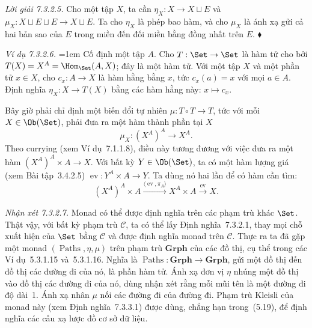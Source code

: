 \noindent\textit{Lời giải 7.3.2.5.}\keepwithnext
Cho một tập $X$, ta cần $\eta_X:X\to X\sqcup E$ và $\mu_X:X\sqcup E\sqcup E\to X\sqcup E$. Ta cho $\eta_X$ là phép bao hàm, và cho $\mu_X$ là ánh xạ gửi cả hai bản sao của $E$ trong miền đến đối miền bằng đồng nhất trên $E$.
\hfill$\blacklozenge$

\noindent\textit{Ví dụ 7.3.2.6.}\keepwithnext
\begingroup\emergencystretch=1em
Cố định một tập $A$. Cho $T:\Set\to\Set$ là hàm tử cho bởi $T(X)=X^A=\Hom_{\Set}(A,X)$; đây là một hàm tử. Với một tập $X$ và một phần tử $x\in X$, cho $c_x:A\to X$ là hàm hằng bằng $x$, tức $c_x(a)=x$ với mọi $a\in A$. Định nghĩa $\eta_X:X\to T(X)$ bằng các hàm hằng này: $x\mapsto c_x$.\par\endgroup

Bây giờ phải chỉ định một biến đổi tự nhiên $\mu:T\circ T\to T$, tức với mỗi $X\in\Ob(\Set)$, phải đưa ra một hàm thành phần tại $X$
\[
\mu_X:(X^A)^A\longrightarrow X^A.
\]
Theo currying (xem Ví dụ~7.1.1.8), điều này tương đương với việc đưa ra một hàm $(X^A)^A\times A\to X$. Với bất kỳ $Y\in\Ob(\Set)$, ta có một hàm lượng giá (xem Bài tập~3.4.2.5) $\operatorname{ev}:Y^A\times A\to Y$. Ta dùng nó hai lần để có hàm cần tìm:
\[
(X^A)^A\times A\xrightarrow{\langle\operatorname{ev},\pi_A\rangle}X^A\times A\xrightarrow{\operatorname{ev}}X.
\]

\noindent\textit{Nhận xét 7.3.2.7.}\keepwithnext
Monad có thể được định nghĩa trên các phạm trù khác $\Set$. Thật vậy, với bất kỳ phạm trù $\mathcal C$, ta có thể lấy Định nghĩa~7.3.2.1, thay mọi chỗ xuất hiện của $\Set$ bằng $\mathcal C$ và được định nghĩa monad trên $\mathcal C$. Thực ra ta đã gặp một monad $(\operatorname{Paths},\eta,\mu)$
trên phạm trù $\mathbf{Grph}$ của các đồ thị, cụ thể trong các Ví dụ~5.3.1.15 và~5.3.1.16. Nghĩa là $\operatorname{Paths}:\mathbf{Grph}\to\mathbf{Grph}$, gửi một đồ thị đến đồ thị các đường đi của nó, là phần hàm tử. Ánh xạ đơn vị $\eta$ nhúng một đồ thị vào đồ thị các đường đi của nó, dùng nhận xét rằng mỗi mũi tên là một đường đi độ dài~1. Ánh xạ nhân $\mu$ nối các đường đi của đường đi. Phạm trù Kleisli của monad này (xem Định nghĩa~7.3.3.1) được dùng, chẳng hạn trong~(5.19), để định nghĩa các cấu xạ lược đồ cơ sở dữ liệu.

